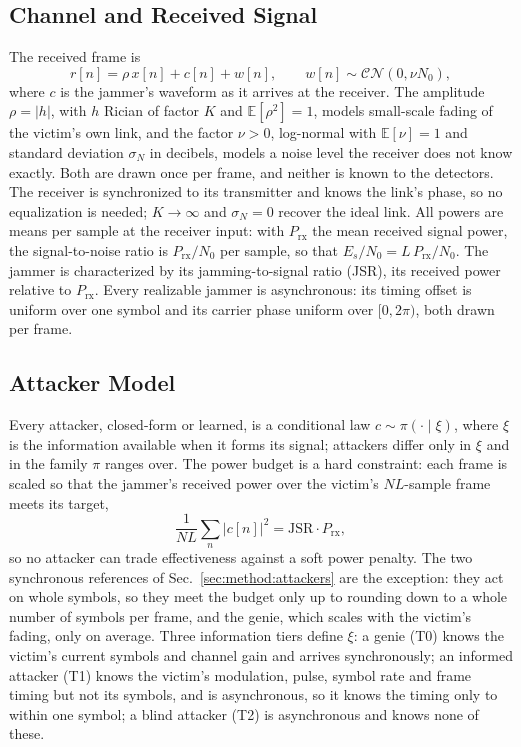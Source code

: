 \subsection{Channel and Received Signal}\label{sec:channel}
The received frame is
\begin{equation}
r[n]=\rho\,x[n]+c[n]+w[n],\qquad w[n]\sim\mathcal{CN}(0,\nu N_0),
\label{eq:rx}
\end{equation}
where $c$ is the jammer's waveform as it arrives at the receiver.
The amplitude $\rho=|h|$, with $h$ Rician of factor $K$ and $\mathbb{E}[\rho^2]=1$, models small-scale fading of the victim's own link, and the factor $\nu>0$, log-normal with $\mathbb{E}[\nu]=1$ and standard deviation $\sigma_N$ in decibels, models a noise level the receiver does not know exactly.
Both are drawn once per frame, and neither is known to the detectors.
The receiver is synchronized to its transmitter and knows the link's phase, so no equalization is needed; $K\to\infty$ and $\sigma_N=0$ recover the ideal link.
All powers are means per sample at the receiver input: with $P_{\mathrm{rx}}$ the mean received signal power, the signal-to-noise ratio is $P_{\mathrm{rx}}/N_0$ per sample, so that $E_s/N_0=L\,P_{\mathrm{rx}}/N_0$.
The jammer is characterized by its jamming-to-signal ratio (JSR), its received power relative to $P_{\mathrm{rx}}$.
Every realizable jammer is asynchronous: its timing offset is uniform over one symbol and its carrier phase uniform over $[0,2\pi)$, both drawn per frame.

\subsection{Attacker Model}\label{sec:attacker}
Every attacker, closed-form or learned, is a conditional law $c\sim\pi(\cdot\mid\xi)$, where $\xi$ is the information available when it forms its signal; attackers differ only in $\xi$ and in the family $\pi$ ranges over.
The power budget is a hard constraint: each frame is scaled so that the jammer's received power over the victim's $NL$-sample frame meets its target,
\begin{equation}
\frac{1}{NL}\sum_{n}|c[n]|^2=\mathrm{JSR}\cdot P_{\mathrm{rx}},
\label{eq:power}
\end{equation}
so no attacker can trade effectiveness against a soft power penalty.
The two synchronous references of Sec.~\ref{sec:method:attackers} are the exception: they act on whole symbols, so they meet the budget only up to rounding down to a whole number of symbols per frame, and the genie, which scales with the victim's fading, only on average.
Three information tiers define $\xi$: a genie (T0) knows the victim's current symbols and channel gain and arrives synchronously; an informed attacker (T1) knows the victim's modulation, pulse, symbol rate and frame timing but not its symbols, and is asynchronous, so it knows the timing only to within one symbol; a blind attacker (T2) is asynchronous and knows none of these.

